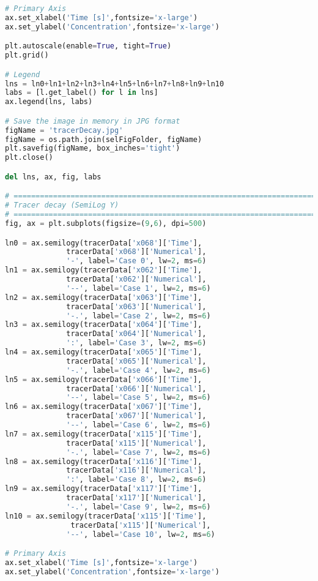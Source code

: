 \begin{lstlisting}[language=python]
# Primary Axis
ax.set_xlabel('Time [s]',fontsize='x-large')
ax.set_ylabel('Concentration',fontsize='x-large')

plt.autoscale(enable=True, tight=True)
plt.grid()

# Legend
lns = ln0+ln1+ln2+ln3+ln4+ln5+ln6+ln7+ln8+ln9+ln10
labs = [l.get_label() for l in lns]
ax.legend(lns, labs)

# Save the image in memory in JPG format
figName = 'tracerDecay.jpg'
figName = os.path.join(selFigFolder, figName)
plt.savefig(figName, box_inches='tight')
plt.close()

del lns, ax, fig, labs

# =============================================================================
# Tracer decay (SemiLog Y)
# =============================================================================
fig, ax = plt.subplots(figsize=(9,6), dpi=500)

ln0 = ax.semilogy(tracerData['x068']['Time'],
              tracerData['x068']['Numerical'],
              '-', label='Case 0', lw=2, ms=6)
ln1 = ax.semilogy(tracerData['x062']['Time'],
              tracerData['x062']['Numerical'],
              '--', label='Case 1', lw=2, ms=6)
ln2 = ax.semilogy(tracerData['x063']['Time'],
              tracerData['x063']['Numerical'],
              '-.', label='Case 2', lw=2, ms=6)
ln3 = ax.semilogy(tracerData['x064']['Time'],
              tracerData['x064']['Numerical'],
              ':', label='Case 3', lw=2, ms=6)
ln4 = ax.semilogy(tracerData['x065']['Time'],
              tracerData['x065']['Numerical'],
              '-.', label='Case 4', lw=2, ms=6)
ln5 = ax.semilogy(tracerData['x066']['Time'],
              tracerData['x066']['Numerical'],
              '--', label='Case 5', lw=2, ms=6)
ln6 = ax.semilogy(tracerData['x067']['Time'],
              tracerData['x067']['Numerical'],
              '--', label='Case 6', lw=2, ms=6)
ln7 = ax.semilogy(tracerData['x115']['Time'],
              tracerData['x115']['Numerical'],
              '-.', label='Case 7', lw=2, ms=6)
ln8 = ax.semilogy(tracerData['x116']['Time'],
              tracerData['x116']['Numerical'],
              ':', label='Case 8', lw=2, ms=6)
ln9 = ax.semilogy(tracerData['x117']['Time'],
              tracerData['x117']['Numerical'],
              '-.', label='Case 9', lw=2, ms=6)
ln10 = ax.semilogy(tracerData['x115']['Time'],
               tracerData['x115']['Numerical'],
              '--', label='Case 10', lw=2, ms=6)

# Primary Axis
ax.set_xlabel('Time [s]',fontsize='x-large')
ax.set_ylabel('Concentration',fontsize='x-large')


\end{lstlisting}
